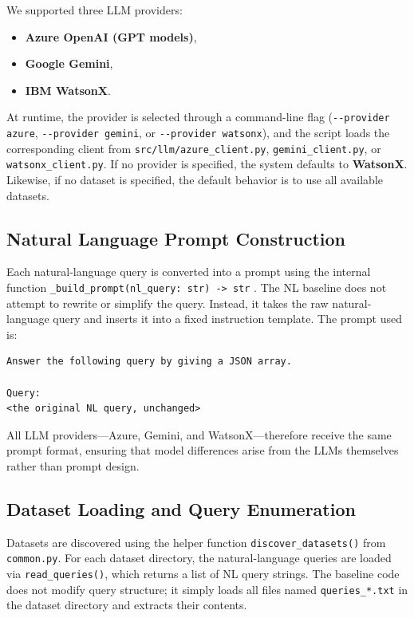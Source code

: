 \documentclass[12pt]{article}
\begin{document}
We supported three LLM providers:
\begin{itemize}
    \item \textbf{Azure OpenAI (GPT models)},
    \item \textbf{Google Gemini},
    \item \textbf{IBM WatsonX}.
\end{itemize}

At runtime, the provider is selected through a command-line flag 
(\verb|--provider azure|, \verb|--provider gemini|, or \verb|--provider watsonx|),
and the script loads the corresponding client from 
\texttt{src/llm/azure\_client.py}, \texttt{gemini\_client.py}, or 
\texttt{watsonx\_client.py}.
If no provider is specified, the system defaults to \textbf{WatsonX}.
Likewise, if no dataset is specified, the default behavior is to use all available datasets.

\subsection{Natural Language Prompt Construction}

Each natural-language query is converted into a prompt using the internal function \verb|_build_prompt(nl_query: str) -> str| .
The NL baseline does not attempt to rewrite or simplify the query.  
Instead, it takes the raw natural-language query and inserts it into a fixed instruction template.  
The prompt used is:

\begin{verbatim}
Answer the following query by giving a JSON array.

Query:
<the original NL query, unchanged>
\end{verbatim}

All LLM providers---Azure, Gemini, and WatsonX---therefore receive the same prompt format, ensuring that model differences arise from the LLMs themselves rather than prompt design.

\subsection{Dataset Loading and Query Enumeration}

Datasets are discovered using the helper function 
\texttt{discover\_datasets()} from \texttt{common.py}.  
For each dataset directory, the natural-language queries are loaded via
\texttt{read\_queries()}, which returns a list of NL query strings.  
The baseline code does not modify query structure; it simply loads all files named
\texttt{queries\_*.txt} in the dataset directory and extracts their contents.
\end{document}
